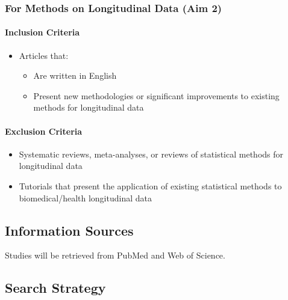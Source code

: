\documentclass[
]{article}
\let\oldparagraph\paragraph
\renewcommand{\paragraph}[1]{\oldparagraph{#1}\mbox{}}
\begin{document}
\hypertarget{for-methods-on-longitudinal-data-aim-2}{%
\subsubsection{For Methods on Longitudinal Data (Aim
2)}\label{for-methods-on-longitudinal-data-aim-2}}

\hypertarget{inclusion-criteria-1}{%
\paragraph{Inclusion Criteria}\label{inclusion-criteria-1}}

\begin{itemize}
\item
  Articles that:

  \begin{itemize}
  \item
    Are written in English
  \item
    Present new methodologies or significant improvements to existing
    methods for longitudinal data
  \end{itemize}
\end{itemize}

\hypertarget{exclusion-criteria-1}{%
\paragraph{Exclusion Criteria}\label{exclusion-criteria-1}}

\begin{itemize}
\item
  Systematic reviews, meta-analyses, or reviews of statistical methods
  for longitudinal data
\item
  Tutorials that present the application of existing statistical methods
  to biomedical/health longitudinal data
\end{itemize}

\hypertarget{information-sources}{%
\subsection{Information Sources}\label{information-sources}}

Studies will be retrieved from PubMed and Web of Science.

\hypertarget{search-strategy}{%
\subsection{Search Strategy}\label{search-strategy}}
\end{document}
